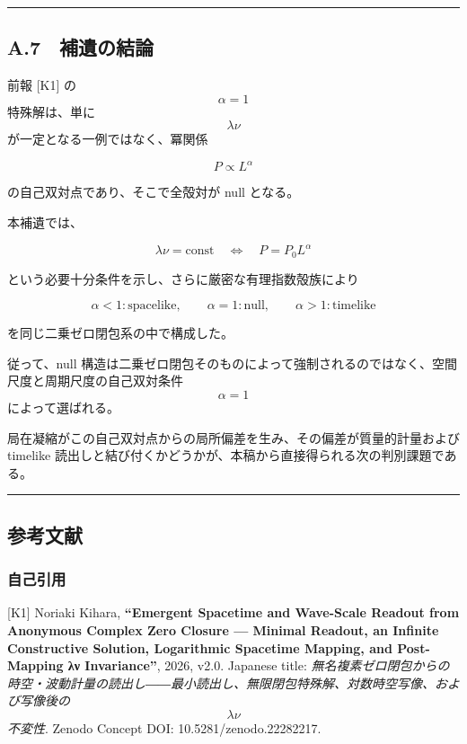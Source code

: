 \documentclass[
  a4paper,
]{ltjsarticle}
\begin{document}
\begin{center}\rule{0.5\linewidth}{0.5pt}\end{center}

\subsection{A.7　補遺の結論}\label{a.7-ux88dcux907aux306eux7d50ux8ad6}

前報 {[}K1{]} の \[\alpha=1\] 特殊解は、単に \[\lambda\nu\]
が一定となる一例ではなく、冪関係

\[
P\propto L^\alpha
\]

の自己双対点であり、そこで全殻対が null となる。

本補遺では、

\[
\boxed{
\lambda\nu=\mathrm{const}
\quad\Longleftrightarrow\quad
P=P_0L^\alpha
}
\]

という必要十分条件を示し、さらに厳密な有理指数殻族により

\[
\boxed{
\alpha<1:
\text{spacelike},
\qquad
\alpha=1:
\text{null},
\qquad
\alpha>1:
\text{timelike}
}
\]

を同じ二乗ゼロ閉包系の中で構成した。

従って、null
構造は二乗ゼロ閉包そのものによって強制されるのではなく、空間尺度と周期尺度の自己双対条件
\[\alpha=1\] によって選ばれる。

局在凝縮がこの自己双対点からの局所偏差を生み、その偏差が質量的計量および
timelike
読出しと結び付くかどうかが、本稿から直接得られる次の判別課題である。

\begin{center}\rule{0.5\linewidth}{0.5pt}\end{center}

\subsection{参考文献}\label{ux53c2ux8003ux6587ux732e}

\subsubsection{自己引用}\label{ux81eaux5df1ux5f15ux7528}

{[}K1{]} Noriaki Kihara, \textbf{``Emergent Spacetime and Wave-Scale
Readout from Anonymous Complex Zero Closure --- Minimal Readout, an
Infinite Constructive Solution, Logarithmic Spacetime Mapping, and
Post-Mapping λν Invariance''}, 2026, v2.0. Japanese title:
\emph{無名複素ゼロ閉包からの時空・波動計量の読出し――最小読出し、無限閉包特殊解、対数時空写像、および写像後の
\[\lambda\nu\] 不変性}. Zenodo Concept DOI: 10.5281/zenodo.22282217.
\end{document}

